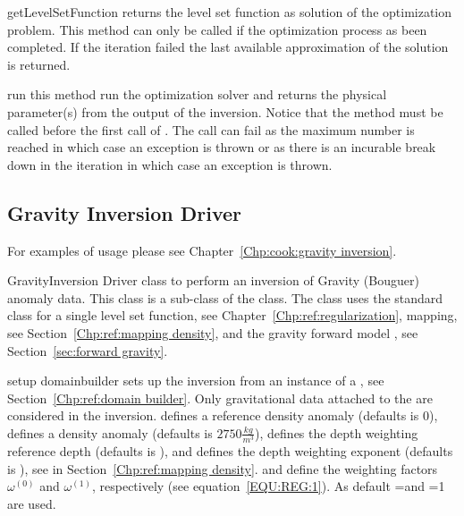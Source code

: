 \begin{methoddesc}[InversionDriver]{getLevelSetFunction}{}
returns the level set function as solution of the optimization problem. This method can only be called if the
optimization process as been completed. If the iteration failed the last available approximation of the
solution is returned.
\end{methoddesc}
        
\begin{methoddesc}[InversionDriver]{run}{}
this method run the optimization solver and returns the physical parameter(s) 
from the output of the inversion. Notice that the  method must be called before the first call
of .
The call can fail as the maximum number is reached in which case
an  exception is thrown or as there is an incurable break down in the
iteration in which case an  exception is thrown. 
\end{methoddesc}

\subsection{Gravity Inversion Driver}
For examples of usage please see Chapter~\ref{Chp:cook:gravity inversion}.

\begin{classdesc}{GravityInversion}{}
Driver class to perform an inversion of  Gravity (Bouguer) anomaly data. This class
is a sub-class of the  class. The class uses the standard
 class for a single level set function, see Chapter~\ref{Chp:ref:regularization},
 mapping, see Section~\ref{Chp:ref:mapping density}, and the 
gravity forward model , see Section~\ref{sec:forward gravity}.
\end{classdesc}

\begin{methoddesc}[GravityInversion]{setup}{
domainbuilder
}
sets up the inversion from an instance  of a , see Section~\ref{Chp:ref:domain builder}.
Only gravitational data attached to the  are considered in the inversion.
 defines a reference density anomaly (defaults is 0), 
 defines a density anomaly (defaults is $2750 \frac{kg}{m^3}$),
 defines the depth weighting reference depth (defaults is \None), and
 defines the depth weighting exponent (defaults is \None),
see  in Section~\ref{Chp:ref:mapping density}.
 and  define the weighting factors
$\omega^{(0)}$ and
$\omega^{(1)}$, respectively (see equation~\ref{EQU:REG:1}).
As default =\None and =1 are used.
\end{methoddesc}

